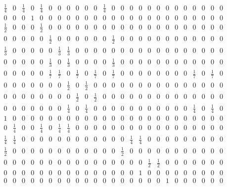 \documentclass[11pt]{report}
\begin{document}
{\begin{appendices}
\begin{figure} [h!]
\begin{equation*}
\begin{array}{ccccccccccccccccccccccccc}
\frac{1}{4}&0&\frac{1}{4}&0&\frac{1}{4}&0&0&0&0&0&0&\frac{1}{4}&0&0&0&0&0&0&0&0&0&0&0&0&0\\

0&0&0&1&0&0&0&0&0&0&0&0&0&0&0&0&0&0&0&0&0&0&0&0&0\\

\frac{1}{2}&0&0&0&\frac{1}{2}&0&0&0&0&0&0&0&0&0&0&0&0&0&0&0&0&0&0&0&0\\

0&0&0&0&0&\frac{1}{2}&0&0&0&0&0&0&\frac{1}{2}&0&0&0&0&0&0&0&0&0&0&0&0\\

\frac{1}{3}&0&0&0&0&0&\frac{1}{3}&\frac{1}{3}&0&0&0&0&0&0&0&0&0&0&0&0&0&0&0&0&0\\

0&0&0&0&0&\frac{1}{3}&0&\frac{1}{3}&0&0&0&0&\frac{1}{3}&0&0&0&0&0&0&0&0&0&0&0&0\\

0&0&0&0&0&\frac{1}{7}&\frac{1}{7}&0&\frac{1}{7}&0&\frac{1}{7}&0&\frac{1}{7}&0&0&0&0&0&0&0&0&\frac{1}{7}&0&\frac{1}{7}&0\\

0&0&0&0&0&0&0&\frac{1}{2}&0&\frac{1}{2}&0&0&0&0&0&0&0&0&0&0&0&0&0&0&0\\

0&0&0&0&0&0&0&0&\frac{1}{2}&0&\frac{1}{2}&0&0&0&0&0&0&0&0&0&0&0&0&0&0\\

0&0&0&0&0&0&0&\frac{1}{4}&0&\frac{1}{4}&0&0&0&0&0&0&0&0&0&0&0&\frac{1}{4}&0&\frac{1}{4}&0\\

1&0&0&0&0&0&0&0&0&0&0&0&0&0&0&0&0&0&0&0&0&0&0&0&0\\

0&\frac{1}{4}&0&0&\frac{1}{4}&0&\frac{1}{4}&\frac{1}{4}&0&0&0&0&0&0&0&0&0&0&0&0&0&0&0&0&0\\

\frac{1}{4}&\frac{1}{4}&0&0&0&0&0&0&0&0&0&0&0&0&\frac{1}{4}&\frac{1}{4}&0&0&0&0&0&0&0&0&0\\

\frac{1}{2}&0&0&0&0&0&0&0&0&0&0&0&0&\frac{1}{2}&0&0&0&0&0&0&0&0&0&0&0\\

0&0&0&0&0&0&0&0&0&0&0&0&0&0&0&0&\frac{1}{2}&\frac{1}{2}&0&0&0&0&0&0&0\\

0&0&0&0&0&0&0&0&0&0&0&0&0&0&0&1&0&0&0&0&0&0&0&0&0\\

0&0&0&0&0&0&0&0&0&0&0&0&0&0&0&0&0&0&1&0&0&0&0&0&0\\


\end{array}
\end{equation*}
\end{figure}
\end{appendices}}
\end{document}
